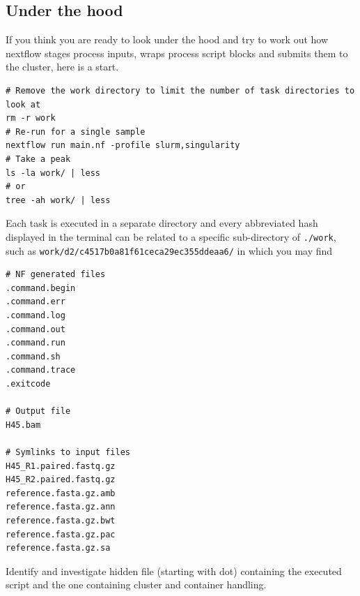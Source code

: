 \subsection{Under the hood}

If you think you are ready to look under the hood and try to work out how nextflow stages process inputs, wraps process script blocks and submits them to the cluster, here is a start. 

\begin{advanced}
\begin{lstlisting}
# Remove the work directory to limit the number of task directories to look at
rm -r work
# Re-run for a single sample
nextflow run main.nf -profile slurm,singularity
# Take a peak
ls -la work/ | less
# or
tree -ah work/ | less
\end{lstlisting}

Each task is executed in a separate directory and every abbreviated hash displayed in the terminal can be related to a specific sub-directory of \texttt{./work},\\ such as
\texttt{work/d2/c4517b0a81f61ceca29ec355ddeaa6/} in which you may find

\begin{lstlisting}
# NF generated files
.command.begin
.command.err
.command.log
.command.out
.command.run
.command.sh
.command.trace
.exitcode

# Output file
H45.bam

# Symlinks to input files
H45_R1.paired.fastq.gz
H45_R2.paired.fastq.gz
reference.fasta.gz.amb
reference.fasta.gz.ann
reference.fasta.gz.bwt
reference.fasta.gz.pac
reference.fasta.gz.sa
\end{lstlisting}

Identify and investigate hidden file (starting with dot) containing the executed script and the one containing cluster and container handling. 

%
%

\end{advanced}




